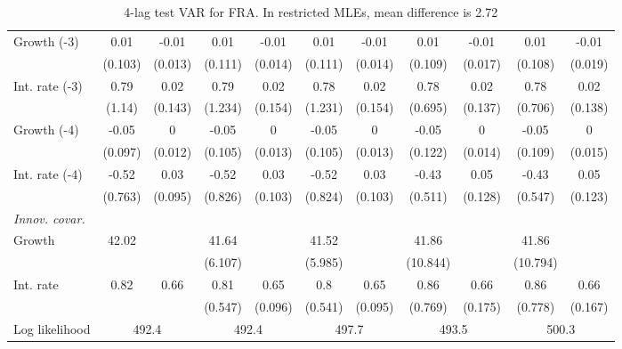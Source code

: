 \begin{table}[htbp]
\begin{tabular}{@{\extracolsep{4pt}}lcccccccccc@{}}
\quad Growth (-3) 	 &0.01 	 & -0.01 	 & 0.01 	 & -0.01 	 & 0.01 	 & -0.01 	 & 0.01 	 & -0.01 	 & 0.01 	 & -0.01	 \\ 
 		 & (0.103) 	 & (0.013) 	 & (0.111) 	 & (0.014) 	 & (0.111) 	 & (0.014) 	 & (0.109) 	 & (0.017) 	 & (0.108) 	 & (0.019) 	 \\ 
\quad Int. rate (-3) 	 &0.79 	 & 0.02 	 & 0.79 	 & 0.02 	 & 0.78 	 & 0.02 	 & 0.78 	 & 0.02 	 & 0.78 	 & 0.02	 \\ 
 		 & (1.14) 	 & (0.143) 	 & (1.234) 	 & (0.154) 	 & (1.231) 	 & (0.154) 	 & (0.695) 	 & (0.137) 	 & (0.706) 	 & (0.138) 	 \\ 
\quad Growth (-4) 	 &-0.05 	 & 0 	 & -0.05 	 & 0 	 & -0.05 	 & 0 	 & -0.05 	 & 0 	 & -0.05 	 & 0	 \\ 
 		 & (0.097) 	 & (0.012) 	 & (0.105) 	 & (0.013) 	 & (0.105) 	 & (0.013) 	 & (0.122) 	 & (0.014) 	 & (0.109) 	 & (0.015) 	 \\ 
\quad Int. rate (-4) 	 &-0.52 	 & 0.03 	 & -0.52 	 & 0.03 	 & -0.52 	 & 0.03 	 & -0.43 	 & 0.05 	 & -0.43 	 & 0.05	 \\ 
 		 & (0.763) 	 & (0.095) 	 & (0.826) 	 & (0.103) 	 & (0.824) 	 & (0.103) 	 & (0.511) 	 & (0.128) 	 & (0.547) 	 & (0.123) 	 \\ 
\rule{0pt}{4ex} \emph{Innov. covar.}  	 & 	 & 	 & 	 & 	 & 	 & 	 & 	 & 	 & 	 &\\ 
\quad Growth 	 &42.02 	 &  	 & 41.64 	 &  	 & 41.52 	 &  	 & 41.86 	 &  	 & 41.86 	 & 	 \\ 
 		 &  	 &  	 & (6.107) 	 &  	 & (5.985) 	 &  	 & (10.844) 	 &  	 & (10.794) 	 &  	 \\ 
\quad Int. rate 	 &0.82 	 & 0.66 	 & 0.81 	 & 0.65 	 & 0.8 	 & 0.65 	 & 0.86 	 & 0.66 	 & 0.86 	 & 0.66	 \\ 
 		 &  	 &  	 & (0.547) 	 & (0.096) 	 & (0.541) 	 & (0.095) 	 & (0.769) 	 & (0.175) 	 & (0.778) 	 & (0.167) 	 \\ 
 \hline \rule{0pt}{4ex} 
  Log likelihood 	 &\multicolumn{2}{c}{492.4} 	 & \multicolumn{2}{c}{492.4} 	 & \multicolumn{2}{c}{497.7} 	 & \multicolumn{2}{c}{493.5} 	 & \multicolumn{2}{c}{500.3}\\ 

 \hline 	\end{tabular}		\caption{4-lag test VAR for FRA. In restricted MLEs, mean difference is 2.72}
		\label{tab:FRA4}

\end{table}